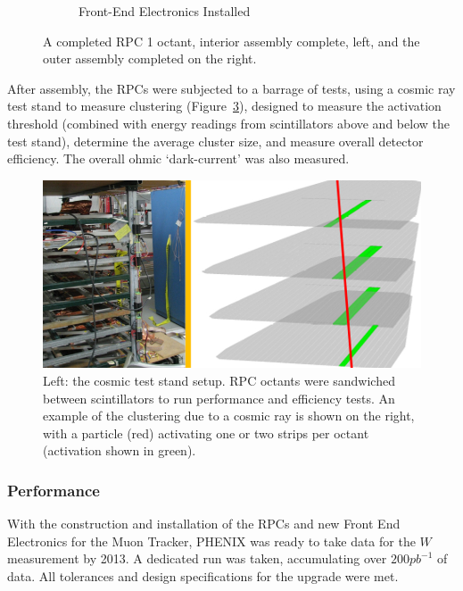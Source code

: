 \begin{figure}
\begin{subfigure}[b]{0.5\textwidth}
    \caption{Front-End Electronics Installed}
    \label{fig:rpc1_fem_installed}
  \end{subfigure}
  \caption{
    A completed RPC 1 octant, interior assembly complete, left, and the outer
    assembly completed on the right.
  }
  \label{fig:rpc1_final_assembly}
\end{figure}

After assembly, the RPCs were subjected to a barrage of tests, using a cosmic
ray test stand to measure clustering (Figure~\ref{fig:rpc_cosmics_test_stand}),
designed to measure the activation threshold (combined with energy readings from
scintillators above and below the test stand), determine the average cluster
size, and measure overall detector efficiency. The overall ohmic `dark-current'
was also measured.

\begin{figure}
  \centering
  \includegraphics[width=\linewidth]{./figures/rpc_cosmics_test_stand}
  \caption{
    Left: the cosmic test stand setup. RPC octants were sandwiched between
    scintillators to run performance and efficiency tests. An example of the
    clustering due to a cosmic ray is shown on the right, with a particle (red)
    activating one or two strips per octant (activation shown in green).
  }
  \label{fig:rpc_cosmics_test_stand}
\end{figure}

\subsubsection{Performance}

With the construction and installation of the RPCs and new Front End Electronics
for the Muon Tracker, PHENIX was ready to take data for the $W$ measurement by
2013. A dedicated run was taken, accumulating over $200 pb^{-1}$ of data. All
tolerances and design specifications for the upgrade were met.

